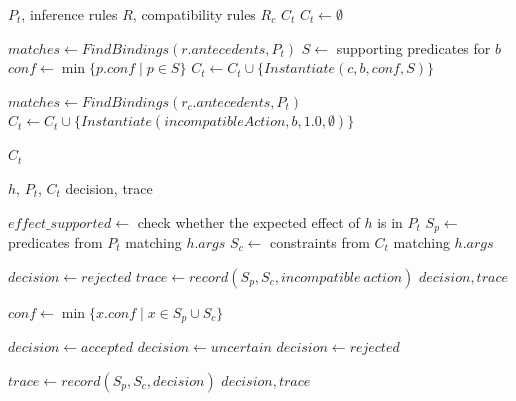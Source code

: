 \documentclass[11pt,titlepage,openright]{book}
\begin{document}
\begin{algorithm}
\caption{Rule evaluation in Layer 3}
\begin{algorithmic}[1]
\Require $P_t$, inference rules $R$, compatibility rules $R_c$
\Ensure $C_t$
\State $C_t \gets \emptyset$

    \State $matches \gets FindBindings(r.antecedents, P_t)$
        \State $S \gets$ supporting predicates for $b$
        \State $conf \gets \min\{p.conf \mid p \in S\}$
                \State $C_t \gets C_t \cup \{Instantiate(c, b, conf, S)\}$
            \EndFor
        \EndIf
    \EndFor
\EndFor

    \State $matches \gets FindBindings(r_c.antecedents, P_t)$
        \State $C_t \gets C_t \cup \{Instantiate(incompatibleAction, b, 1.0, \emptyset)\}$
    \EndFor
\EndFor

\State \Return $C_t$
\end{algorithmic}
\end{algorithm}



\begin{algorithm}
\caption{Step validation with compatibility enforcement}
\begin{algorithmic}[1]
\Require $h$, $P_t$, $C_t$
\Ensure decision, trace

\State $effect\_supported \gets$ check whether the expected effect of $h$ is in $P_t$
\State $S_p \gets$ predicates from $P_t$ matching $h.args$
\State $S_c \gets$ constraints from $C_t$ matching $h.args$

    \State $decision \gets rejected$
    \State $trace \gets record(S_p, S_c, incompatible\ action)$
    \State \Return $decision, trace$
\EndIf

\State $conf \gets \min\{x.conf \mid x \in S_p \cup S_c\}$

    \State $decision \gets accepted$
    \State $decision \gets uncertain$
\Else
    \State $decision \gets rejected$
\EndIf

\State $trace \gets record(S_p, S_c, decision)$
\State \Return $decision, trace$
\end{algorithmic}
\end{algorithm}
\end{document}
